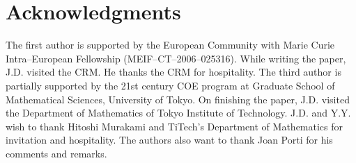 \documentclass[a4paper]{amsart}
\theoremstyle{plain}
\theoremstyle{definition}
\theoremstyle{remark}
\begin{document}
\clearpage

\section*{Acknowledgments}

The first author  is supported by the {European Community} with Marie Curie Intra--European Fellowship (MEIF--CT--2006--025316). While writing the paper, J.D. visited the CRM. He thanks the CRM for hospitality.
The third author is partially supported by 
the 21st century COE program at Graduate School of Mathematical Sciences, 
University of Tokyo.
On finishing the paper, J.D. visited the Department of Mathematics of Tokyo Institute of Technology.
J.D. and Y.Y. wish to thank Hitoshi Murakami and
 TiTech's Department of Mathematics for invitation and hospitality. The authors also want to thank Joan Porti for his comments and remarks.

%










\end{document}
